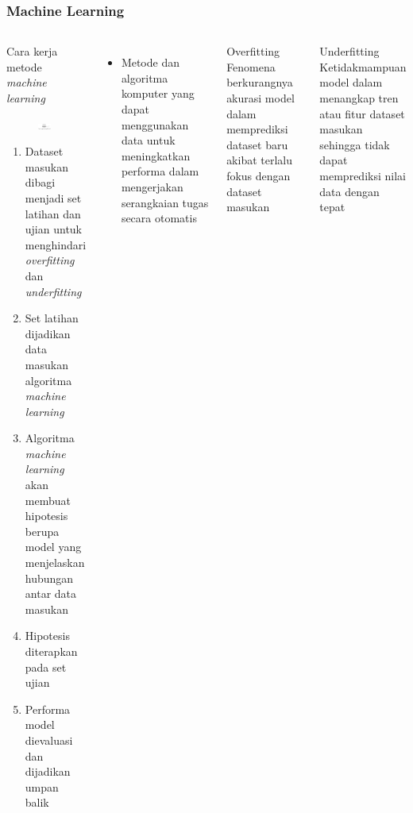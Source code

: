 \documentclass[8pt]{beamer}
\begin{document}
\begin{frame}
  \frametitle{Machine Learning}
  \begin{columns}[c]
    \begin{block}{\center Cara kerja metode \textit{machine learning}}
      \begin{figure}
        \includegraphics[width=0.8\textwidth]{figure/mldiagram.jpg}
      \end{figure}
      \begin{enumerate}
        \item Dataset masukan dibagi menjadi set latihan dan ujian untuk menghindari \textit{overfitting} dan \textit{underfitting}
        \item Set latihan dijadikan data masukan algoritma \textit{machine learning}
        \item Algoritma \textit{machine learning} akan membuat hipotesis berupa model yang menjelaskan hubungan antar data masukan
        \item Hipotesis diterapkan pada set ujian
        \item Performa model dievaluasi dan dijadikan umpan balik
      \end{enumerate}
    \end{block}
    \begin{itemize}
      \item Metode dan algoritma komputer yang dapat
        menggunakan data untuk meningkatkan performa dalam mengerjakan
        serangkaian tugas secara otomatis \cite{mitchell1997}
    \end{itemize}
    \begin{block}{\center \normalsize Overfitting}
      \small
    Fenomena berkurangnya akurasi model dalam memprediksi dataset baru akibat
    terlalu fokus dengan dataset masukan
    \end{block}
    \begin{block}{\center \normalsize Underfitting}
      \small
      Ketidakmampuan model dalam menangkap tren atau fitur dataset masukan
      sehingga tidak dapat memprediksi nilai data dengan tepat
    \end{block}
  \end{columns}
\end{frame}
\end{document}
